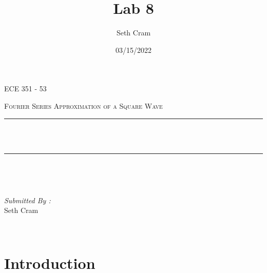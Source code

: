 \documentclass[12pt]{report}
\title{Lab 8}		%
\author{ Seth Cram}
\date{03/15/2022}
\makeatletter
\let\thetitle\@title
\makeatother
\begin{document}

\begin{titlepage}
	\centering
    \vspace*{0.5 cm}
\begin{center}    \textsc{\Large   ECE 351 - 53 }\\[2.0 cm]	\end{center}%
	\textsc{\Large Fourier Series Approximation of a Square Wave }\\[.5 cm]				%
	\rule{\linewidth}{0.2 mm} \\[0.4 cm]
	{ \huge \bfseries \thetitle}\\
	\rule{\linewidth}{0.2 mm} \\[1.5 cm]
	
	\begin{minipage}{0.4\textwidth}
		\begin{flushleft} \large
			\end{flushleft}
			\end{minipage}~
			\begin{minipage}{0.4\textwidth}
            
			\begin{flushright} \large
			\emph{Submitted By :} \\
			Seth Cram  
		\end{flushright}
           
	\end{minipage}\\[2 cm]
	
\end{titlepage}


\tableofcontents
\pagebreak

\renewcommand{\thesection}{\arabic{section}}

\section{Introduction}
\end{document}
